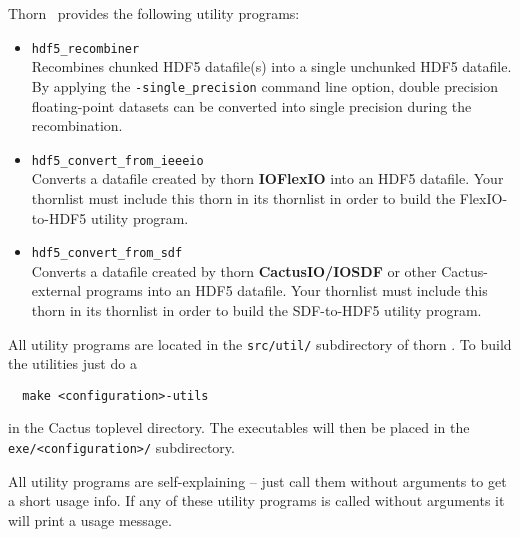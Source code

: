 \documentclass{article}
\begin{document}
Thorn \ThisThorn\ provides the following utility programs:
%
\begin{itemize}
  \item {\tt hdf5\_recombiner}\\
    Recombines chunked HDF5 datafile(s) into a single unchunked HDF5 datafile.
    By applying the {\tt -single\_precision} command line option,
    double precision floating-point datasets can be converted into single
    precision during the recombination.
  \item {\tt hdf5\_convert\_from\_ieeeio}\\
    Converts a datafile created by thorn {\bf IOFlexIO} into an HDF5 datafile. Your thornlist must include this thorn
    in its thornlist in order to build the FlexIO-to-HDF5 utility program.
  \item {\tt hdf5\_convert\_from\_sdf}\\
    Converts a datafile created by thorn {\bf CactusIO/IOSDF} or other Cactus-external programs into an HDF5 datafile. Your thornlist must include this thorn
    in its thornlist in order to build the SDF-to-HDF5 utility program.
\end{itemize}
%
All utility programs are located in the {\tt src/util/} subdirectory of thorn
\ThisThorn. To build the utilities just do a

\begin{verbatim}
  make <configuration>-utils
\end{verbatim}

in the Cactus toplevel directory. The executables will then be placed in the
{\tt exe/<configuration>/} subdirectory.

All utility programs are self-explaining -- just call them without arguments
to get a short usage info.
If any of these utility programs is called without arguments it will print
a usage message.

\end{document}
